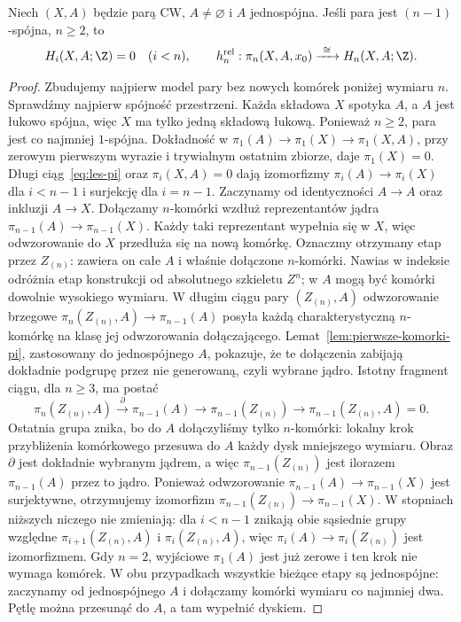 \begin{twierdzenie}
\label{thm:hurewicz-wzgledny}
Niech $(X,A)$ będzie parą CW,
$A\ne\varnothing$ i $A$
jednospójna. Jeśli para
jest $(n-1)$-spójna,
$n\geq2$, to
\[
 H_i(X,A;\Z)=0\quad(i<n),
 \qquad
 h_n^{\mathrm{rel}}:
 \pi_n(X,A,x_0)
 \xrightarrow{\ \cong\ }
 H_n(X,A;\Z).
\]
\end{twierdzenie}
\begin{proof}
Zbudujemy najpierw
model pary bez nowych
komórek poniżej
wymiaru $n$.
Sprawdźmy najpierw spójność przestrzeni. Każda składowa $X$
spotyka $A$, a $A$ jest łukowo spójna, więc $X$ ma tylko jedną
składową łukową. Ponieważ $n\geq2$, para jest co najmniej
$1$-spójna. Dokładność w
$\pi_1(A)\to\pi_1(X)\to\pi_1(X,A)$, przy zerowym pierwszym
wyrazie i trywialnym ostatnim zbiorze, daje $\pi_1(X)=0$.
Długi ciąg~\eqref{eq:les-pi}
oraz $\pi_i(X,A)=0$
dają izomorfizmy
$\pi_i(A)\to\pi_i(X)$
dla $i<n-1$ i
surjekcję dla
$i=n-1$.
Zaczynamy od
identyczności $A\to A$
oraz inkluzji $A\to X$.
Dołączamy $n$-komórki
wzdłuż reprezentantów
jądra
$\pi_{n-1}(A)\to
\pi_{n-1}(X)$.
Każdy taki reprezentant
wypełnia się w $X$,
więc odwzorowanie do $X$
przedłuża się na
nową komórkę.
Oznaczmy otrzymany etap przez $Z_{(n)}$: zawiera on całe $A$
i właśnie dołączone $n$-komórki. Nawias w indeksie odróżnia
etap konstrukcji od absolutnego szkieletu $Z^n$; w $A$ mogą
być komórki dowolnie wysokiego wymiaru.
W długim ciągu pary $(Z_{(n)},A)$ odwzorowanie brzegowe
$\pi_n(Z_{(n)},A)\to\pi_{n-1}(A)$
posyła każdą
charakterystyczną
$n$-komórkę na
klasę jej odwzorowania
dołączającego.
Lemat~\ref{lem:pierwsze-komorki-pi},
zastosowany do
jednospójnego $A$,
pokazuje, że
te dołączenia
zabijają dokładnie
podgrupę przez
nie generowaną,
czyli wybrane jądro.
Istotny fragment ciągu, dla $n\geq3$, ma postać
\[
 \pi_n(Z_{(n)},A)\xrightarrow{\ \partial\ }
 \pi_{n-1}(A)\longrightarrow\pi_{n-1}(Z_{(n)})
 \longrightarrow\pi_{n-1}(Z_{(n)},A)=0.
\]
Ostatnia grupa znika, bo do $A$ dołączyliśmy tylko $n$-komórki:
lokalny krok przybliżenia komórkowego przesuwa do $A$
każdy dysk mniejszego wymiaru. Obraz $\partial$ jest dokładnie
wybranym jądrem, a więc $\pi_{n-1}(Z_{(n)})$ jest ilorazem
$\pi_{n-1}(A)$ przez to jądro. Ponieważ odwzorowanie
$\pi_{n-1}(A)\to\pi_{n-1}(X)$ jest surjektywne,
otrzymujemy izomorfizm $\pi_{n-1}(Z_{(n)})\to\pi_{n-1}(X)$.
W stopniach
niższych niczego
nie zmieniają: dla $i<n-1$ znikają obie sąsiednie grupy względne
$\pi_{i+1}(Z_{(n)},A)$ i $\pi_i(Z_{(n)},A)$, więc
$\pi_i(A)\to\pi_i(Z_{(n)})$ jest izomorfizmem.
Gdy $n=2$,
wyjściowe $\pi_1(A)$
jest już zerowe
i ten krok nie
wymaga komórek.
W obu przypadkach wszystkie bieżące etapy są jednospójne:
zaczynamy od jednospójnego $A$ i dołączamy komórki wymiaru
co najmniej dwa. Pętlę można przesunąć do $A$, a tam wypełnić dyskiem.


\end{proof}
